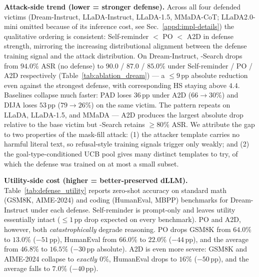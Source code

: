\textbf{Attack-side trend (lower = stronger defense).}
Across all four defended victims (Dream-Instruct, LLaDA-Instruct,
LLaDA-1.5, MMaDA-CoT; LLaDA2.0-mini omitted because of its inference cost,
see Sec.~\ref{appd:impl-details}) the qualitative ordering is consistent:
Self-reminder $<$ PO $<$ A2D in defense strength, mirroring the increasing
distributional alignment between the defense training signal and the
attack distribution. On Dream-Instruct, \method-Search drops from
$94.0\%$ ASR (no defense) to $90.0$ / $87.0$ / $85.0\%$ under Self-reminder
/ PO / A2D respectively (Table~\ref{tab:ablation_dream}) --- a $\le 9$\,pp
absolute reduction even against the strongest defense, with corresponding
HS staying above $4.4$. Baselines collapse much faster: PAD loses
$36$\,pp under A2D ($66 \to 30\%$) and DIJA loses $53$\,pp
($79 \to 26\%$) on the same victim. The pattern repeats on LLaDA,
LLaDA-1.5, and MMaDA --- A2D produces the largest absolute drop relative
to the base victim but \method-Search retains $\ge 80\%$ ASR. We attribute
the gap to two properties of the mask-fill attack: (1) the attacker
template carries no harmful literal text, so refusal-style training
signals trigger only weakly; and (2) the goal-type-conditioned UCB pool
gives \method many distinct templates to try, of which the defense was
trained on at most a small subset.

\textbf{Utility-side cost (higher = better-preserved dLLM).}
Table~\ref{tab:defense_utility} reports zero-shot accuracy on standard
math (GSM8K, AIME-2024) and coding (HumanEval, MBPP) benchmarks for
Dream-Instruct under each defense. Self-reminder is prompt-only and
leaves utility essentially intact ($\le 1$\,pp drop expected on every
benchmark). PO and A2D, however, both \emph{catastrophically} degrade
reasoning. PO drops GSM8K from $64.0\%$ to $13.0\%$
($-51$\,pp), HumanEval from $66.0\%$ to $22.0\%$ ($-44$\,pp), and the
average from $46.8\%$ to $16.5\%$ ($-30$\,pp absolute). A2D is even more
severe: GSM8K and AIME-2024 collapse to \emph{exactly $0\%$}, HumanEval
drops to $16\%$ ($-50$\,pp), and the average falls to $7.0\%$ ($-40$\,pp).

